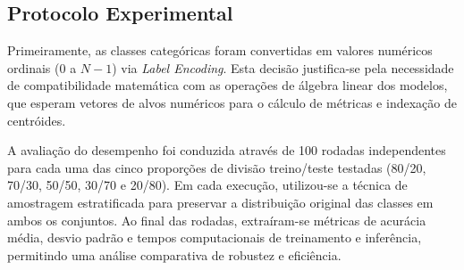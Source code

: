 \subsection{Protocolo Experimental}
Primeiramente, as classes categóricas foram convertidas em valores numéricos ordinais (0 a $N-1$) via \textit{Label Encoding}. Esta decisão justifica-se pela necessidade de compatibilidade matemática com as operações de álgebra linear dos modelos, que esperam vetores de alvos numéricos para o cálculo de métricas e indexação de centróides.

A avaliação do desempenho foi conduzida através de 100 rodadas independentes para cada uma das cinco proporções de divisão treino/teste testadas (80/20, 70/30, 50/50, 30/70 e 20/80). Em cada execução, utilizou-se a técnica de amostragem estratificada para preservar a distribuição original das classes em ambos os conjuntos. Ao final das rodadas, extraíram-se métricas de acurácia média, desvio padrão e tempos computacionais de treinamento e inferência, permitindo uma análise comparativa de robustez e eficiência.
